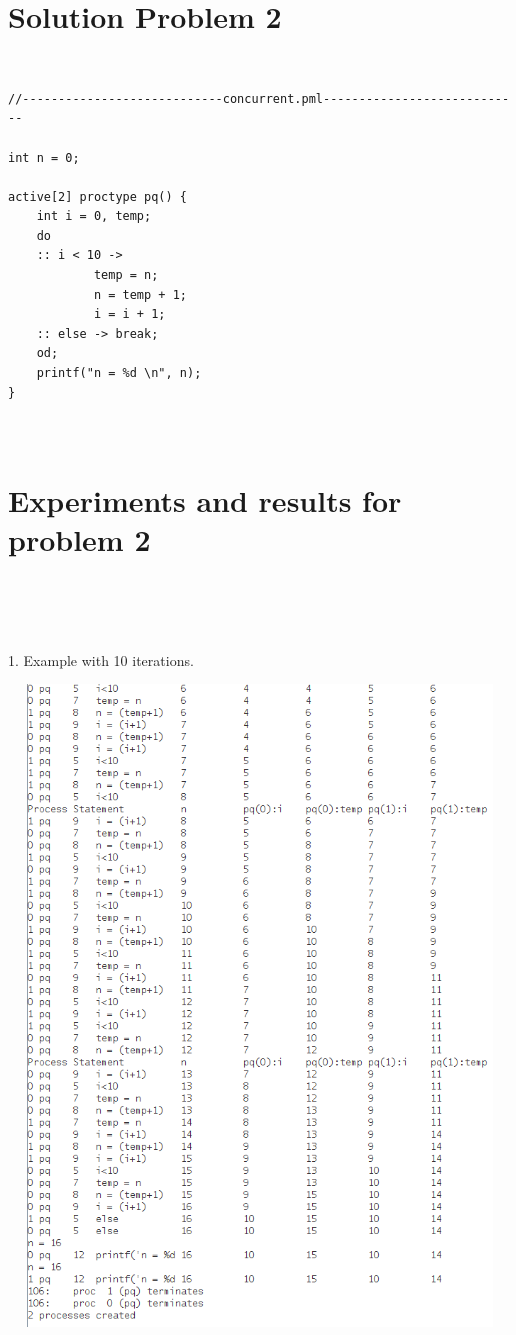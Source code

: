 \documentclass[14pt]{article}
\begin{document}
\section*{Solution Problem 2}\\
\begin{lstlisting}
//----------------------------concurrent.pml----------------------------

int n = 0;

active[2] proctype pq() {
	int i = 0, temp;
	do
	:: i < 10 -> 
			temp = n; 
			n = temp + 1; 
			i = i + 1;
	:: else -> break;
	od;
	printf("n = %d \n", n);
}



\end{lstlisting}
\newpage
\section*{Experiments and results for problem 2}
\\\\\\
\begin{center}
1. Example with 10 iterations.
\vspace{10mm}

\includegraphics[height=6.7in, width = 6in]{concurrent1.png}\\
\end{center}\\
\end{document}
